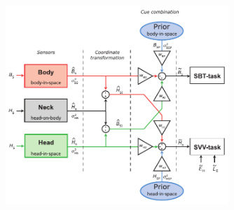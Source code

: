 \begin{figure}
    \includegraphics[width=0.75\textwidth]{src/paper1/figure1.pdf}
    

\end{figure}
